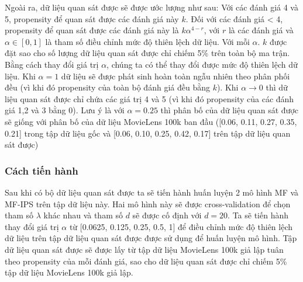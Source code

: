 Ngoài ra, dữ liệu quan sát được sẽ được ước lượng như sau: Với các đánh giá 4 và 5, propensity để quan sát được các đánh giá này $k$. Đối với các đánh giá < 4, propensity để quan sát được các đánh giá này là $k\alpha^{4-r}$, với $r$ là các đánh giá và $\alpha \in [0,1]$ là tham số điều chỉnh mức độ thiên lệch dữ liệu. Với mỗi $\alpha$. $k$ được đặt sao cho số lượng dữ liệu quan sát được chỉ chiếm 5\% trên toàn bộ ma trận. Bằng cách thay đổi giá trị $\alpha$, chúng ta có thể thay đổi được mức độ thiên lệch dữ liệu. Khi $\alpha = 1$ dữ liệu sẽ được phát sinh hoàn toàn ngẫu nhiên theo phân phối đều (vì khi đó propensity của toàn bộ đánh giá đều bằng $k$). Khi $\alpha \rightarrow 0$ thì dữ liệu quan sát được chỉ chứa các giá trị 4 và 5 (vì khi đó propensity của các đánh giá 1,2 và 3 bằng 0). Lưu ý là với $\alpha = 0.25$ thì phân bố của dữ liệu quan sát được sẽ giống với phân bố của dữ liệu MovieLens 100k ban đầu ([0.06, 0.11, 0.27, 0.35, 0.21] trong tập dữ liệu gốc và [0.06, 0.10, 0.25, 0.42, 0.17] trên tập dữ liệu quan sát được)

\subsubsection{Cách tiến hành}
Sau khi có bộ dữ liệu quan sát được ta sẽ tiến hành huấn luyện 2 mô hình MF và MF-IPS trên tập dữ liệu này. Hai mô hình này sẽ được cross-validation để chọn tham số $\lambda$ khác nhau và tham số $d$ sẽ được cố định với $d = 20$. Ta sẽ tiến hành thay đổi giá trị $\alpha$ từ [0.0625, 0.125, 0.25, 0.5, 1] để điều chỉnh mức độ thiên lệch dữ liệu trên tập dữ liệu quan sát được được sử dụng để huấn luyện mô hình. Tập dữ liệu quan sát được sẽ được lấy từ tập dữ liệu MovieLens 100k giả lập tuân theo propensity của mỗi đánh giá, sao cho dữ liệu quan sát được chỉ chiếm 5\% tập dữ liệu MovieLens 100k giả lập.
